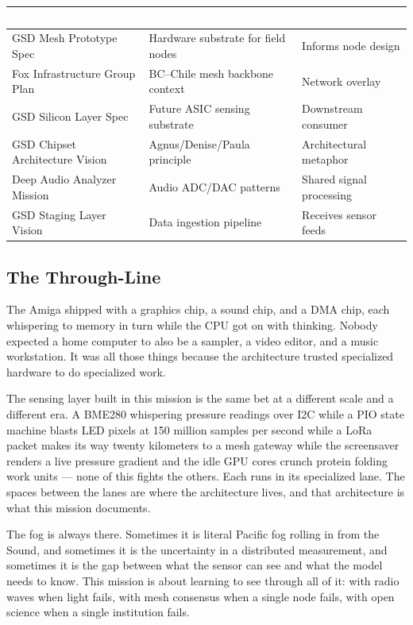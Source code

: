 \documentclass[11pt,letterpaper]{article}
\newcommand{\tableheader}[1]{\textbf{\sffamily\textcolor{white}{#1}}}
\begin{document}
\begin{center}
\begin{tabularx}{\textwidth}{L{4cm}L{5cm}L{4cm}}
\toprule
{}
\tableheader{Document} & \tableheader{Relationship} & \tableheader{Dependency} \\
\midrule
GSD Mesh Prototype Spec & Hardware substrate for field nodes & Informs node design \\
Fox Infrastructure Group Plan & BC--Chile mesh backbone context & Network overlay \\
GSD Silicon Layer Spec & Future ASIC sensing substrate & Downstream consumer \\
GSD Chipset Architecture Vision & Agnus/Denise/Paula principle & Architectural metaphor \\
Deep Audio Analyzer Mission & Audio ADC/DAC patterns & Shared signal processing \\
GSD Staging Layer Vision & Data ingestion pipeline & Receives sensor feeds \\
\bottomrule
\end{tabularx}
\end{center}

\subsection{The Through-Line}

The Amiga shipped with a graphics chip, a sound chip, and a DMA chip, each whispering to memory in turn while the CPU got on with thinking. Nobody expected a home computer to also be a sampler, a video editor, and a music workstation. It was all those things because the architecture trusted specialized hardware to do specialized work.

The sensing layer built in this mission is the same bet at a different scale and a different era. A BME280 whispering pressure readings over I2C while a PIO state machine blasts LED pixels at 150 million samples per second while a LoRa packet makes its way twenty kilometers to a mesh gateway while the screensaver renders a live pressure gradient and the idle GPU cores crunch protein folding work units --- none of this fights the others. Each runs in its specialized lane. The spaces between the lanes are where the architecture lives, and that architecture is what this mission documents.

The fog is always there. Sometimes it is literal Pacific fog rolling in from the Sound, and sometimes it is the uncertainty in a distributed measurement, and sometimes it is the gap between what the sensor can see and what the model needs to know. This mission is about learning to see through all of it: with radio waves when light fails, with mesh consensus when a single node fails, with open science when a single institution fails.
\end{document}
